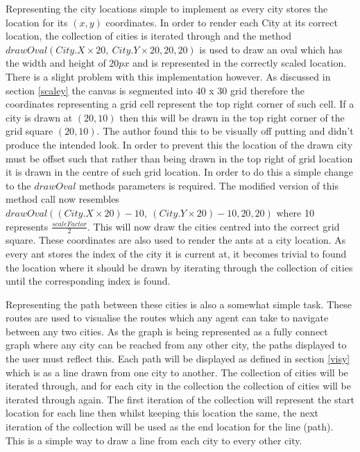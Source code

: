 Representing the city locations simple to implement as every city stores the location for its $(x,y)$ coordinates. In order to render each City at its correct location, the collection of cities is iterated through and the method $drawOval(City.X \times 20,\ City.Y \times 20, 20, 20 )$ is used to draw an oval which has the width and height of $20px$ and is represented in the correctly scaled location. There is a slight problem with this implementation however. As discussed in section \ref{scaley} the canvas is segmented into 40 x 30 grid therefore the coordinates representing a grid cell represent the top right corner of such cell. If a city is drawn at $(20,10)$ then this will be drawn in the top right corner of the grid square $(20,10)$. The author found this to be visually off putting and didn’t produce the intended look. In order to prevent this the location of the drawn city must be offset such that rather than being drawn in the top right of grid location it is drawn in the centre of such grid location. In order to do this a simple change to the $drawOval$ methods parameters is required. The modified version of this method call now resembles $drawOval((City.X \times 20) - 10,\ (City.Y \times 20) - 10, 20, 20 )$ where 10 represents $\frac{scaleFactor}{2}$. This will now draw the cities centred into the correct grid square. These coordinates are also used to render the ants at a city location. As every ant stores the index of the city it is current at, it becomes trivial to found the location where it should be drawn by iterating through the collection of cities until the corresponding index is found.

Representing the path between these cities is also a somewhat simple task. These routes are used to visualise the routes which any agent can take to navigate between any two cities. As the graph is being represented as a fully connect graph where any city can be reached from any other city, the paths displayed to the user must reflect this. Each path will be displayed as defined in section \ref{visy} which is as a line drawn from one city to another. The collection of cities will be iterated through, and for each city in the collection the collection of cities will be iterated through again. The first iteration of the collection will represent the start location for each line then whilst keeping this location the same, the next iteration of the collection will be used as the end location for the line (path). This is a simple way to draw a line from each city to every other city.

